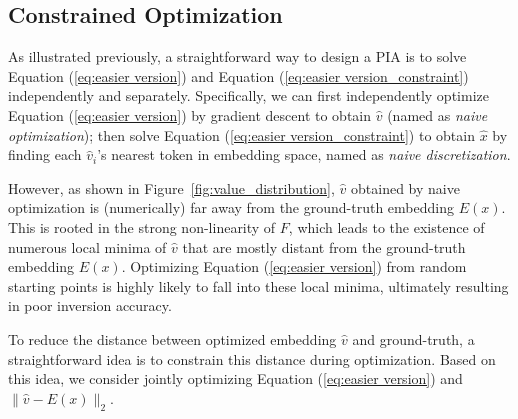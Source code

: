 \subsection{Constrained Optimization}


As illustrated previously, a straightforward way to design a PIA is to solve Equation (\ref{eq:easier version}) and Equation (\ref{eq:easier version_constraint}) independently and separately. Specifically, we can first independently optimize Equation (\ref{eq:easier version}) by gradient descent to obtain $\hat{v}$ (named as \textit{naive optimization}); then solve Equation (\ref{eq:easier version_constraint}) to obtain $\hat{x}$ by finding each $\hat{v}_i$'s nearest token in embedding space, named as \textit{naive discretization}. 

However, as shown in Figure~\ref{fig:value_distribution}, $\hat{v}$ obtained by naive optimization is (numerically) far away from the ground-truth embedding $E(x)$. This is rooted in the strong non-linearity of $F$, which leads to the existence of numerous local minima of $\hat{v}$ that are mostly distant from the ground-truth embedding $E(x)$.  Optimizing Equation (\ref{eq:easier version}) from random starting  points is highly likely to fall into these local minima, ultimately resulting in poor inversion accuracy. %

To reduce the distance between optimized embedding $\hat{v}$ and ground-truth, a straightforward idea is to constrain this distance during optimization.  Based on this idea, we consider jointly optimizing  Equation (\ref{eq:easier version}) and  $\|\hat{v}-E(x)\|_2$.






